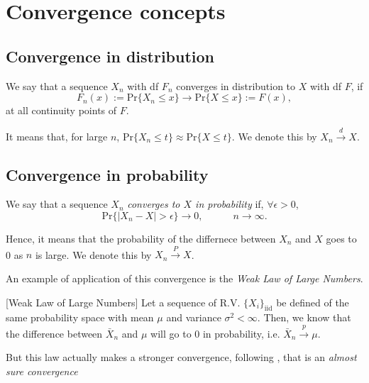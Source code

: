 \section{Convergence concepts}\label{convconc}


\subsection*{Convergence in distribution}

\begin{definition}
We say that a sequence $X_n$ with df $F_n$ converges in distribution to $X$ with df $F$, if 
\begin{equation}
F_n(x):=\text{Pr}\big\{X_n\leq x\big\}\longrightarrow \text{Pr}\{X\leq x\}:=F(x),
\end{equation}
at all continuity points of $F$. 
\end{definition}
It means that, for large $n$, $\text{Pr}\{X_n\leq t\}\approx\text{Pr}\{X\leq t\}$.
We denote this by $X_n\stackrel{d}{\to}X$.


\subsection*{Convergence in probability}

\begin{definition}
We say that a sequence $X_n$ \emph{converges to $X$ in probability} if, $\forall\epsilon>0$, 
\begin{equation}
\text{Pr}\Big\{|X_n-X|>\epsilon\Big\}\to 0, \qquad\quad n\to\infty.
\end{equation}
\end{definition}
Hence, it means that the probability of the differnece between $X_n$ and $X$ goes to 0 as $n$ is large.  We denote this by $X_n\stackrel{P}{\rightarrow}X$.

An example of application of this convergence is the \emph{Weak Law of Large Numbers}. 

\begin{theorem}\label{wlln}[Weak Law of Large Numbers]
Let a sequence of R.V. $\{X_i\}_{\text{iid}}$ be defined of the same probability space with mean $\mu$ and variance $\sigma^2<\infty$. Then, we know that the difference between $\bar{X}_n$  and $\mu$ will go to 0 in probability, i.e. $\bar{X}_n\stackrel{p}{\to}\mu$.
\end{theorem}

But this law actually makes a stronger convergence, following \citet{kolmogorov_foundations_1956}, that is an \emph{almost sure convergence}

